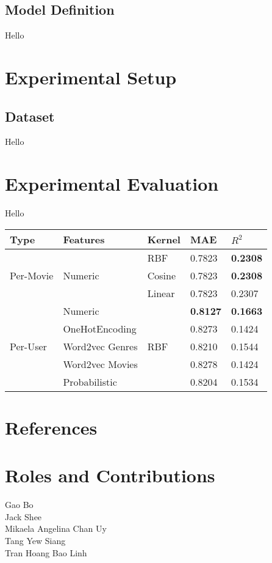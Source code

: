 \documentclass[a4paper]{article}
\theoremstyle{genius}
\begin{document}
\subsection{Model Definition}
Hello

\section{Experimental Setup}
\subsection{Dataset}
Hello

\section{Experimental Evaluation}
Hello 
\begin{center}
	\begin{tabular}{lllll}
		\hline
		Type & Features & Kernel & MAE & $R^{2}$ \\
		\hline
		\multirow{3}{*}{Per-Movie} &\multirow{3}{*}{Numeric}
		 & RBF & 0.7823 & \textbf{0.2308}\\
		& & Cosine & 0.7823 & \textbf{0.2308} \\
		& & Linear & 0.7823 & 0.2307 \\
		\hline
		\multirow{5}{*}{Per-User} & Numeric & \multirow{5}{*}{RBF} & \textbf{0.8127} & \textbf{0.1663} \\
		& OneHotEncoding & & 0.8273 & 0.1424 \\
		& Word2vec Genres & & 0.8210 & 0.1544 \\
		& Word2vec Movies & & 0.8278 & 0.1424 \\
		& Probabilistic   & & 0.8204 & 0.1534\\
		\hline
	\end{tabular}
\end{center}

\section{References}


\section{Roles and Contributions}

\begin{description}
\item [Gao Bo]
\item [Jack Shee]
\item [Mikaela Angelina Chan Uy] 
\item [Tang Yew Siang]
\item [Tran Hoang Bao Linh]
\end{description}
\end{document}
